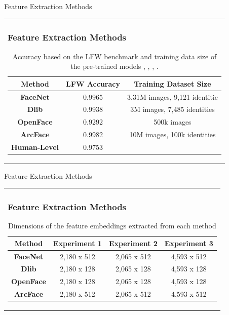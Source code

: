 \documentclass[11pt]{beamer}
\begin{document}
\begin{frame}{Feature Extraction Methods}
\begin{tabular}{l}
\parbox{1\linewidth}{
\frametitle{Feature Extraction Methods}
\begin{table}[H]
\begin{tabular}{||c c c||} 
 \hline
  Method & LFW Accuracy & Training Dataset Size\\ [0.5ex]
 \hline\hline
 \textbf{FaceNet} & 0.9965 & 3.31M images, 9,121 identitie\\ 
 \hline
 \textbf{Dlib} & 0.9938 & 3M images, 7,485 identities\\
 \hline
 \textbf{OpenFace} & 0.9292 & 500k images\\
 \hline
 \textbf{ArcFace} & 0.9982 & 10M images, 100k identities\\
 \hline
 \textbf{Human-Level} \cite{amos} & 0.9753 &\\
 \hline
\end{tabular}
\caption{Accuracy based on the LFW benchmark and training data size of the pre-trained models \cite{sandberg}, \cite{geitgey}, \cite{amos2016}, \cite{deng2019}.}
\label{table:2}
\end{table}

}
\end{tabular}  
\end{frame}

\begin{frame}{Feature Extraction Methods}
\begin{tabular}{l}
\parbox{1\linewidth}{
\frametitle{Feature Extraction Methods}
\begin{table}[H]
\centering
\begin{tabular}{||c c c c||} 
 \hline
  Method & Experiment 1 & Experiment 2 & Experiment 3\\ [0.5ex]
 \hline\hline
 \textbf{FaceNet} & 2,180 x 512 & 2,065 x 512 & 4,593 x 512\\ 
 \hline
 \textbf{Dlib} & 2,180 x 128 & 2,065 x 128 & 4,593 x 128\\
 \hline
 \textbf{OpenFace} & 2,180 x 128 & 2,065 x 128 & 4,593 x 128\\
 \hline
 \textbf{ArcFace} & 2,180 x 512 & 2,065 x 512 & 4,593 x 512\\
 \hline
\end{tabular}
\caption{Dimensions of the feature embeddings extracted from each method}
\label{table:3}
\end{table}
}
\end{tabular}  
\end{frame}
\end{document}

